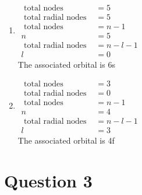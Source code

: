 \documentclass[a4paper, fleqn]{article}
\begin{document}
\begin{enumerate}[label=(\alph{*})]
\item 
$\begin{aligned}\text{ total nodes }&=5\\\text{ total radial nodes }&=5\\\text{ total nodes }&=n-1\\n&=5\\\text{ total radial nodes }&=n-l-1\\l&=0\end{aligned}$\\
The associated orbital is 6s
\item 
$\begin{aligned}\text{ total nodes }&=3\\\text{ total radial nodes }&=0\\\text{ total nodes }&=n-1\\n&=4\\\text{ total radial nodes }&=n-l-1\\l&=3\end{aligned}$\\
The associated orbital is 4f
\end{enumerate}

\pagebreak

\section{Question 3}
\end{document}
